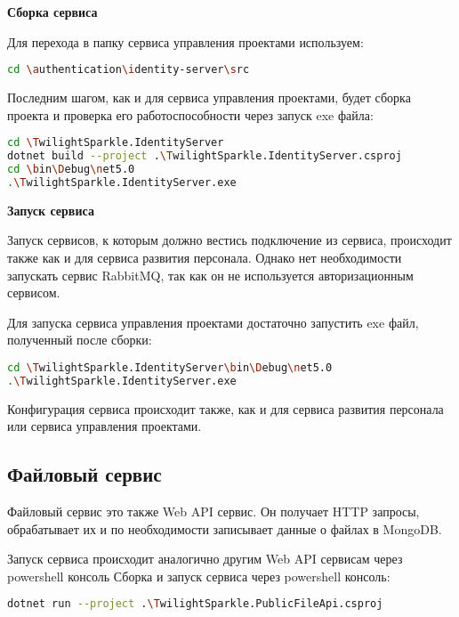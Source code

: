 \bigskip
\textbf{Сборка сервиса}

Для перехода в папку сервиса управления проектами используем:

\begin{lstlisting}[language=bash]
cd \authentication\identity-server\src
\end{lstlisting}

Последним шагом, как и для сервиса управления проектами, будет сборка проекта и проверка его работоспособности через запуск exe файла:

\begin{lstlisting}[language=bash]
cd \TwilightSparkle.IdentityServer
dotnet build --project .\TwilightSparkle.IdentityServer.csproj
cd \bin\Debug\net5.0
.\TwilightSparkle.IdentityServer.exe
\end{lstlisting}

\bigskip
\textbf{Запуск сервиса}

Запуск сервисов, к которым должно вестись подключение из сервиса, происходит также как и для сервиса развития персонала. Однако нет необходимости запускать сервис RabbitMQ, так как он не используется авторизационным сервисом.

Для запуска сервиса управления проектами достаточно запустить exe файл, полученный после сборки:

\begin{lstlisting}[language=bash]
cd \TwilightSparkle.IdentityServer\bin\Debug\net5.0
.\TwilightSparkle.IdentityServer.exe
\end{lstlisting}

Конфигурация сервиса происходит также, как и для сервиса развития персонала или сервиса управления проектами.


\subsection{Файловый сервис}

Файловый сервис это также Web API сервис. Он получает HTTP запросы, обрабатывает их и по необходимости записывает данные о файлах в MongoDB.

Запуск сервиса происходит аналогично другим Web API сервисам через powershell консоль Сборка и запуск сервиса через powershell консоль:

\begin{lstlisting}[language=bash]
dotnet run --project .\TwilightSparkle.PublicFileApi.csproj
\end{lstlisting}


